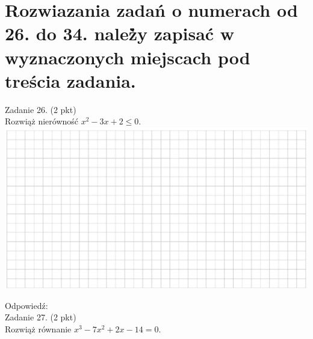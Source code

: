 \documentclass[10pt]{article}
\begin{document}
\section*{Rozwiazania zadań o numerach od 26. do 34. należ̀y zapisać w wyznaczonych miejscach pod treścia zadania.}
Zadanie 26. (2 pkt)\\
Rozwiąż nierówność \(x^{2}-3 x+2 \leq 0\).\\
\includegraphics[max width=\textwidth, center]{2024_11_21_ad52a81220b9b2239458g-10}

Odpowiedź:\\
Zadanie 27. (2 pkt)\\
Rozwiąż równanie \(x^{3}-7 x^{2}+2 x-14=0\).
\end{document}
